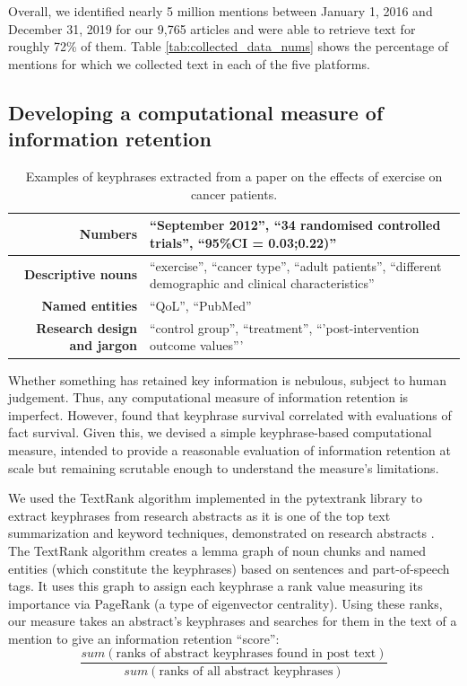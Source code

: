 \documentclass[letterpaper]{article} %
\begin{document}
Overall, we identified nearly 5 million mentions between January 1, 2016 and December 31, 2019 for our 9,765 articles and were able to retrieve text for roughly 72\% of them. Table \ref{tab:collected_data_nums} shows the percentage of mentions for which we collected text in each of the five platforms.


\subsection{Developing a computational measure of information retention}
\begin{table}[ht]
    \centering
    \begin{tabular}{r|l}
        \textbf{Numbers} & ``September 2012'', ``34 randomised controlled trials'', ``95\%CI = 0.03;0.22)''\\ \hline
         \textbf{Descriptive nouns} & ``exercise'', ``cancer type'', ``adult patients'', ``different demographic and clinical characteristics''\\ \hline
         \textbf{Named entities} & ``QoL'', ``PubMed''\\ \hline
         \textbf{Research design and jargon} & ``control group'', ``treatment'', ``'post-intervention outcome values''' \\
    \end{tabular}
    \caption{Examples of keyphrases extracted from a paper on the effects of exercise on cancer patients.}
    \label{tab:keyphrase_example}
\end{table}

Whether something has retained key information is nebulous, subject to human judgement. Thus, any computational measure of information retention is imperfect. However, \citet{ribeiroMessageDistortionInformation2019} found that keyphrase survival correlated with evaluations of fact survival. Given this, we devised a simple keyphrase-based computational measure, intended to provide a reasonable evaluation of information retention at scale but remaining scrutable enough to understand the measure's limitations.

We used the TextRank algorithm implemented in the pytextrank library to extract keyphrases from research abstracts as it is one of the top text summarization and keyword techniques, demonstrated on research abstracts \citep{mihalceaTextRankBringingOrder2004}.
The TextRank algorithm creates a lemma graph of noun chunks and named entities (which constitute the keyphrases) based on sentences and part-of-speech tags. It uses this graph to assign each keyphrase a rank value measuring its importance via PageRank (a type of eigenvector centrality). %
Using these ranks, our measure takes an abstract's keyphrases and searches for them in the text of a mention to give an information retention ``score'':
$$\frac{sum(\text{ranks of abstract keyphrases found in post text})}{sum(\text{ranks of all abstract keyphrases})}$$
\end{document}
